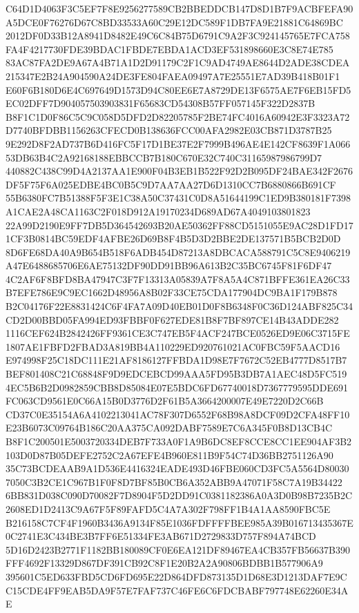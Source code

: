 \documentclass[UTF8,fontset=fandol,zihao=-4,a4paper]{ctexart}
\begin{document}
{{C64D1D4063F3C5EF7F8E9256277589CB2BBEDDCB147D8D1B7F9ACBFEFA90A5DCE0F76276D67C8BD33533A60C29E12DC589F1DB7FA9E21881C64869BC
2012DF0D33B12A8941D8482E49C6C84B75D6791C9A2F3C924145765E7FCA758FA4F4217730FDE39BDAC1FBDE7EBDA1ACD3EF531898660E3C8E74E785
83AC87FA2DE9A67A4B71A1D2D91179C2F1C9AD4749AE8644D2ADE38CDEA215347E2B24A904590A24DE3FE804FAEA09497A7E25551E7AD39B418B01F1
E60F6B180D6E4C697649D1573D94C80EE6E7A8729DE13F6575AE7F6EB15FD5EC02DFF7D904057503903831F65683CD54308B57FF057145F322D2837B
B8F1C1D0F86C5C9C058D5DFD2D82205785F2BE74FC4016A60942E3F3323A72D7740BFDBB1156263CFECD0B138636FCC00AFA2982E03CB871D3787B25
9E292D8F2AD737B6D416FC5F17D1BE37E2F7999B496AE4E142CF8639F1A06653DB63B4C2A92168188EBBCCB7B180C670E32C740C31165987986799D7
440882C438C99D4A2137AA1E900F04B3EB1B522F92D2B095DF24BAE342F2676DF5F75F6A025EDBE4BC0B5C9D7AA7AA27D6D1310CC7B6880866B691CF
55B6380FC7B51388F5F3E1C38A50C37431C0D8A51644199C1ED9B380181F7398A1CAE2A48CA1163C2F018D912A19170234D689AD67A4049103801823
22A99D2190E9FF7DB5D364542693B20AE50362FF88CD5151055E9AC28D1FD171CF3B0814BC59EDF4AFBE26D69B8F4B5D3D2BBE2DE137571B5BCB2D0D
8D6FE68DA40A9B654B518F6ADB454D87213A8DBCACA588791C5C8E9406219A47E6488685706E6AE75132DF90DD91BB96A613B2C35BC6745F81F6DF47
4C2AF6F8BFD8BA47947C3F7F13313A05839A7F8A5A4C871BFFE361EA26C33B7EFE786E9C9EC1662D48956A8B02F33CE75CDA177904DC9BA1F179B878
B2C04176F22E8831424C6F4FA7A09D40EB01D0F8B6348F0C36D124ABF825C34CD2D00BBD05FA994ED93FBBF0F627EDE81B8F7BF897CE14B43ADDE282
1116CEF624B2842426FF9361CE3C747EB5F4ACF247BCE0526ED9E06C3715FE1807AE1FBFD2FBAD3A819BB4A110229ED920761021AC0FBC59F5AACD16
E974998F25C18DC111E21AF8186127FFBDA1D98E7F7672C52EB4777D8517B7BEF801408C21C68848F9D9EDCEBCD99AAA5FD95B3DB7A1AEC48D5FC519
4EC5B6B2D0982859CBB8D85084E07E5BDC6FD67740018D7367779595DDE691FC063CD9561E0C66A15B0D3776D2F61B5A3664200007E49E7220D2C66B
CD37C0E35154A6A4102213041AC78F307D6552F68B98A8DCF09D2CFA48FF10E23B6073C09764B186C20AA375CA092DABF7589E7C6A345F0B8D13CB4C
B8F1C200501E5003720334DEB7F733A0F1A9B6DC8EF8CCE8CC1EE904AF3B2103D0D87B05DEFE2752C2A67EFE4B960E811B9F54C74D36BB2751126A90
35C73BCDEAAB9A1D536E4416324EADE493D46FBE060CD3FC5A5564D800307050C3B2CE1C967B1F0F8D7BF85B0CB6A352ABB9A47071F58C7A19B34422
6BB831D038C090D70082F7D8904F5D2DD91C0381182386A0A3D0B98B7235B2C2608ED1D2413C9A67F5F89FAFD5C4A7A302F798FF1B4A1AA8590FBC5E
B216158C7CF4F1960B3436A9134F85E1036FDFFFFBEE985A39B016713435367E0C2741E3C434BE3B7FF6E51334FE3AB671D2729833D757F894A74BCD
5D16D2423B2771F1182BB180089CF0E6EA121DF89467EA4CB357FB56637B390FFF4692F13329D867DF391CB92C8F1E20B2A2A90806BDBB1B577906A9
395601C5ED633FBD5CD6FD695E22D864DFD873135D1D68E3D1213DAF7E9CC15CDE4FF9EAB5DA9F57E7FAF737C46FE6C6FDCBABF797748E62260E34AE
}}
\end{document}
